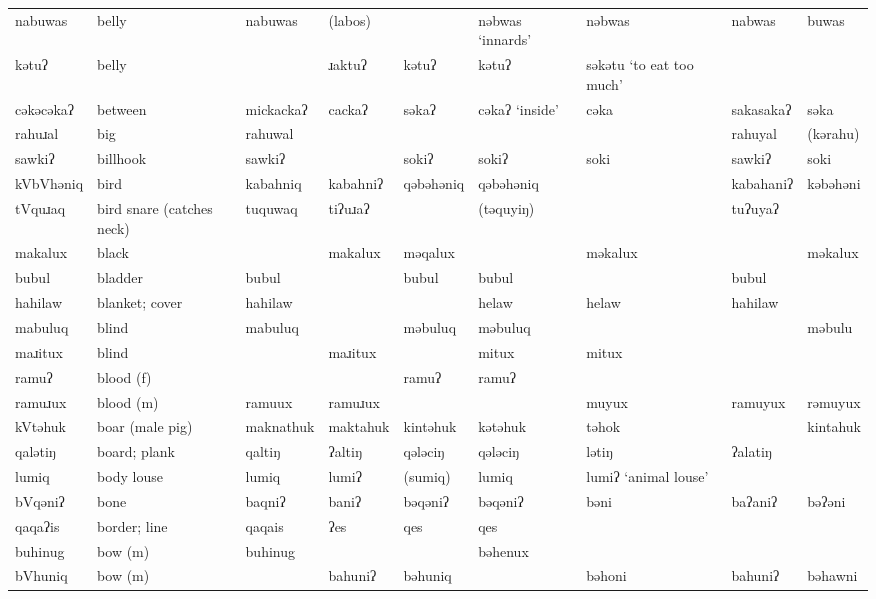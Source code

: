 \begin{landscape}
\begin{longtable}{*{9}{>{\raggedright\arraybackslash}p{}}}
\text{*}nabuwas      & belly & nabuwas & (labos) &  & nəbwas `innards' & nəbwas & nabwas & buwas\\
\text{*}kətuʔ       & belly &  & ɹaktuʔ & kətuʔ & kətuʔ & səkətu `to eat too much' &  & \\
\text{*}cəkəcəkaʔ    & between & mickackaʔ & cackaʔ & səkaʔ & cəkaʔ `inside' & cəka & sakasakaʔ & səka\\
\text{*}rahuɹal      & big & rahuwal &  &  &  &  & rahuyal & (kərahu)\\
\text{*}sawkiʔ       & billhook & sawkiʔ &  & sokiʔ & sokiʔ & soki & sawkiʔ & soki\\
\text{*}kVbVhəniq    & bird & kabahniq & kabahniʔ & qəbəhəniq & qəbəhəniq &  & kabahaniʔ & kəbəhəni\\
\text{*}tVquɹaq      & bird snare (catches neck) & tuquwaq & tiʔuɹaʔ &  & (təquyiŋ) &  & tuʔuyaʔ & \\
\text{*}makalux      & black &  & makalux & məqalux &  & məkalux &  & məkalux\\
\text{*}bubul        & bladder & bubul &  & bubul & bubul &  & bubul & \\
\text{*}hahilaw      & blanket; cover & hahilaw &  &  & helaw & helaw & hahilaw & \\
\text{*}mabuluq      & blind & mabuluq &  & məbuluq & məbuluq &  &  & məbulu\\
\text{*}maɹitux      & blind &  & maɹitux &  & mitux & mitux &  & \\
\text{*}ramuʔ        & blood (f) &  &  & ramuʔ & ramuʔ &  &  & \\
\text{*}ramuɹux      & blood (m) & ramuux & ramuɹux &  &  & muyux & ramuyux & rəmuyux\\
\text{*}kVtəhuk      & boar (male pig) & maknathuk & maktahuk & kintəhuk & kətəhuk & təhok &  & kintahuk\\
\text{*}qalətiŋ      & board; plank & qaltiŋ & ʔaltiŋ & qələciŋ & qələciŋ & lətiŋ & ʔalatiŋ & \\
\text{*}lumiq        & body louse & lumiq & lumiʔ & (sumiq) & lumiq & lumiʔ \newline `animal louse' &  & \\
\text{*}bVqəniʔ      & bone & baqniʔ & baniʔ & bəqəniʔ & bəqəniʔ & bəni & baʔaniʔ & bəʔəni\\
\text{*}qaqaʔis      & border; line & qaqais & ʔes & qes & qes &  &  & \\
\text{*}buhinug      & bow (m) & buhinug &  &  & bəhenux &  &  & \\
\text{*}bVhuniq      & bow (m) &  & bahuniʔ & bəhuniq &  & bəhoni & bahuniʔ & bəhawni\\

\end{longtable}
\end{landscape}
